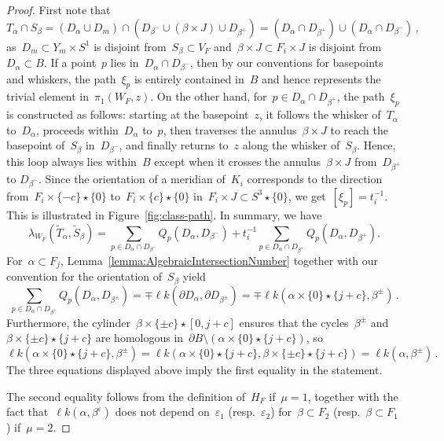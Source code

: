 \documentclass[10.9pt,a4paper]{amsart}
\theoremstyle{definition}
\theoremstyle{remark}
\newcommand{\lk}{\ell k}
\begin{document}
\begin{proof}
First note that
\[
T_{\alpha}\cap S_{\beta} = (D_{\alpha} \cup D_m) \cap (D_{\beta^-} \cup (\beta \times J) \cup D_{\beta^+})=(D_{\alpha} \cap D_{\beta^+})\cup(D_{\alpha} \cap D_{\beta^-})\,,
\]
as~$D_m\subset Y_m \times S^1$ is disjoint from~$S_{\beta} \subset V_F$ and~$\beta \times J\subset F_{i} \times J$ is disjoint from~$D_{\alpha} \subset B$.
If a point~$p$ lies in~$D_{\alpha} \cap D_{\beta^-}$, then by our conventions for basepoints and whiskers, the path~$\xi_p$ is entirely contained in~$B$ and hence represents the trivial element in~$\pi_1(W_F,z)$. On the other hand, for~$p \in D_{\alpha} \cap D_{\beta^+}$, the path~$\xi_p$ is constructed as follows: starting at the basepoint~$z$, it follows the whisker of~$T_\alpha$ to~$D_{\alpha}$, proceeds within~$D_{\alpha}$ to~$p$, then traverses the annulus~$\beta \times J$ to reach the basepoint of~$S_{\beta}$ in~$D_{\beta^-}$, and finally returns to~$z$ along the whisker of~$S_{\beta}$.
Hence, this loop always lies within~$B$ except when it crosses the annulus~$\beta \times J$ from~$D_{\beta^+}$ to $D_{\beta^-}$. Since the orientation
of a meridian of~$K_i$ corresponds to the direction from~$F_{i} \times \{-c\} \star \{0\}$ to~$F_{i} \times \{c\} \star \{0\}$ in~$F_{i} \times J \subset S^3 \star \{0\}$, we get~$[\xi_p]=t_i^{-1}$. This is illustrated in Figure~\ref{fig:class-path}.
In summary, we have
\[
\lambda_{W_F}(\tilde T_{\alpha},\tilde S_{\beta}) = \sum_{p\in D_{\alpha} \cap D_{\beta^-}} Q_p(D_{\alpha}, D_{\beta^-}) 
+ t_{i}^{-1}\sum_{p \in D_{\alpha} \cap D_{\beta^+}}  Q_p(D_{\alpha}, D_{\beta^+}).
\]
For~$\alpha\subset F_j$, Lemma~\ref{lemma:AlgebraicIntersectionNumber} together with our convention for the orientation of~$S_\beta$ yield
\[
\sum_{p \in D_{\alpha} \cap D_{\beta^\pm}} Q_p(D_{\alpha}, D_{\beta^\pm}) =\mp \lk(\partial D_{\alpha},\partial D_{\beta^{\pm}})=\mp \lk(\alpha \times \{0\} \star \{j+c\}, \beta^{\pm})\,.
\]
Furthermore, the cylinder~$\beta \times \{\pm c\} \star [0, j+c]$
ensures that the cycles~$\beta^\pm$ and~$\beta \times \{\pm c \} \star \{j+c\}$ are homologous in~$\partial B \setminus (\alpha \times \{0\} \star \{j+c\})$, so
\[
\lk(\alpha \times \{0\} \star \{j+c\}, \beta^{\pm})=\lk(\alpha \times \{0\} \star \{j+c\}, \beta \times \{\pm c\} \star \{j+c\}) = \lk(\alpha, \beta^\pm)\,.
\]
The three equations displayed above imply the first equality in the statement.

The second equality follows from the definition of~$H_F$ if~$\mu=1$,
together with the fact that~$\lk(\alpha,\beta^\varepsilon)$ does not depend on~$\varepsilon_1$ (resp.~$\varepsilon_2$)
for~$\beta\subset F_2$ (resp.~$\beta\subset F_1$) if~$\mu=2$.
\end{proof}
\end{document}

